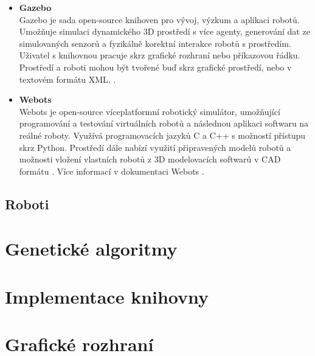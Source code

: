\begin{itemize}
    \item \textbf{Gazebo}\\
        Gazebo je sada open-source knihoven pro vývoj, výzkum a aplikaci
        robotů. Umožňuje simulaci dynamického 3D prostředí s více agenty,
        generování dat ze simulovaných senzorů a fyzikálně korektní interakce
        robotů s prostředím. Uživatel s knihovnou pracuje skrz grafické
        rozhraní nebo příkazovou řádku. Prostředí a roboti mohou být tvořené
        buď  skrz grafické prostředí, nebo v textovém formátu XML.
        \citet{koenig2004design}. 
    \item \textbf{Webots}\\
        Webots je open-source víceplatformní robotický simulátor, umožňující
        programování a testování virtuálních robotů a následnou aplikaci
        softwaru na reálné roboty. Využívá programovacích jazyků C a C++ s
        možností přístupu skrz Python. Prostředí dále nabízí využití
        připravených modelů robotů a možnosti vložení vlastních robotů z 3D
        modelovacích softwarů v CAD formátu \citet{michel2004cyberbotics}. Více
        informací v dokumentaci Webots \citep{Webots}.

\end{itemize}



\subsection{Roboti}

\section{Genetické algoritmy}

\section{Implementace knihovny}

\section{Grafické rozhraní}
